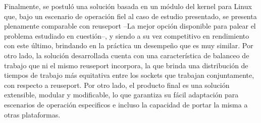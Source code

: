\begin{conclusion}
Finalmente, se postuló una solución basada en un módulo del kernel para Linux que, bajo un escenario de operación fiel al caso de estudio presentado, se presenta plenamente comparable con reuseport --La mejor opción disponible para palear el problema estudiado en cuestión--, y siendo a su vez competitivo en rendimiento con este último, brindando en la práctica un desempeño que es muy similar. Por otro lado, la solución desarrollada cuenta con una característica de balanceo de trabajo que ni el mismo reuseport incorpora, la que brinda una distribución de tiempos de trabajo más equitativa entre los sockets que trabajan conjuntamente, con respecto a reuseport. Por otro lado, el producto final es una solución extensible, modular y modificable, lo que garantiza su fácil adaptación para escenarios de operación especificos e incluso la capacidad de portar la misma a otras plataformas.

\end{conclusion}